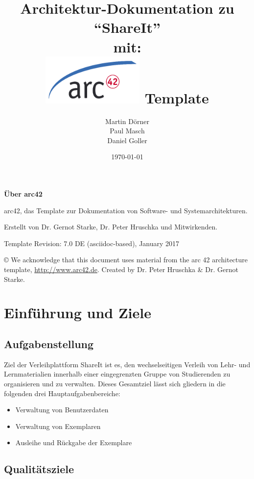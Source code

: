 \documentclass[]{report}
\title{Architektur-Dokumentation zu “ShareIt” \\ mit:\\\includegraphics{images/arc42-logo.png} Template\vfill}
\date{\today}
\author{Martin Dörner\\ Paul Masch\\ Daniel Goller}
\begin{document}
\maketitle

\section{}

\textbf{Über arc42}

arc42, das Template zur Dokumentation von Software- und
Systemarchitekturen.

Erstellt von Dr. Gernot Starke, Dr. Peter Hruschka und Mitwirkenden.

Template Revision: 7.0 DE (asciidoc-based), January 2017

© We acknowledge that this document uses material from the arc 42
architecture template, \url{http://www.arc42.de}. Created by Dr. Peter
Hruschka \& Dr. Gernot Starke.

\tableofcontents

\newpage

\section{Einführung und Ziele}\label{section-introduction-and-goals}

\subsection{Aufgabenstellung}\label{_aufgabenstellung}

Ziel der Verleihplattform ShareIt ist es, den wechselseitigen Verleih von Lehr- und Lernmaterialien innerhalb einer eingegrenzten Gruppe von Studierenden zu organisieren und zu verwalten. Dieses Gesamtziel lässt sich gliedern in die folgenden drei Hauptaufgabenbereiche:

\begin{itemize}
\item
  Verwaltung von Benutzerdaten 
\item
  Verwaltung von Exemplaren 
\item
  Ausleihe und Rückgabe der Exemplare
\end{itemize}

\subsection{Qualitätsziele}\label{_qualit_tsziele}
\end{document}
